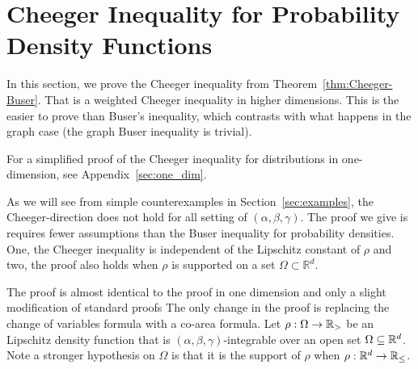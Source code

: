 \section{Cheeger Inequality for Probability Density Functions}\label{sec:cheeger}

In this section, we prove the Cheeger inequality from
Theorem~\ref{thm:Cheeger-Buser}. That is a weighted Cheeger inequality in higher dimensions.
This is the easier to prove than Buser's inequality, which
contrasts with what happens in the graph case (the graph Buser
    inequality is trivial).

For a simplified proof of the Cheeger inequality for distributions
in one-dimension, see Appendix~\ref{sec:one_dim}.

As we will see from simple counterexamples in
Section~\ref{sec:examples}, the Cheeger-direction does not
hold for all setting of $(\alpha,\beta,\gamma)$. The proof we give is
requires fewer assumptions than the Buser inequality for
probability densities. One, the Cheeger inequality is
independent of the Lipschitz constant of $\rho$ and two, the proof
also holds when $\rho$ is supported on a set
$\Omega \subset \mathbb{R}^d$.

The proof is almost identical to the proof in one dimension and only a
slight modification of standard proofs The only change in the proof is
replacing the change of variables formula with a co-area formula.  Let
$\rho:\Omega \to \mathbb{R}_>$ be an Lipschitz density function that is
$(\alpha,\beta,\gamma)$-integrable over an open set $\Omega \subseteq
\mathbb{R}^d$.  Note a stronger hypothesis  on $\Omega$ is that it is the support of
$\rho$ when  $\rho:\mathbb{R}^d \to \mathbb{R}_\leq$. 

